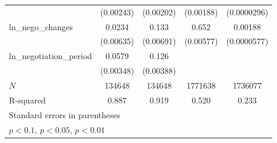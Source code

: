 {\begin{tabular}{l*{4}{c}}
            &   (0.00243)         &   (0.00202)         &   (0.00188)         & (0.0000296)         \\
\addlinespace
ln\_nego\_changes&      0.0234\sym{***}&       0.133\sym{***}&       0.652\sym{***}&     0.00188\sym{***}\\
            &   (0.00635)         &   (0.00691)         &   (0.00577)         & (0.0000577)         \\
\addlinespace
ln\_negotiation\_period&      0.0579\sym{***}&       0.126\sym{***}&                     &                     \\
            &   (0.00348)         &   (0.00388)         &                     &                     \\
\midrule
\(N\)       &      134648         &      134648         &     1771638         &     1736077         \\
R-squared   &       0.887         &       0.919         &       0.520         &       0.233         \\
\bottomrule
\multicolumn{5}{l}{\footnotesize Standard errors in parentheses}\\
\multicolumn{5}{l}{\footnotesize \sym{*} \(p<0.1\), \sym{**} \(p<0.05\), \sym{***} \(p<0.01\)}\\
\end{tabular}
}
